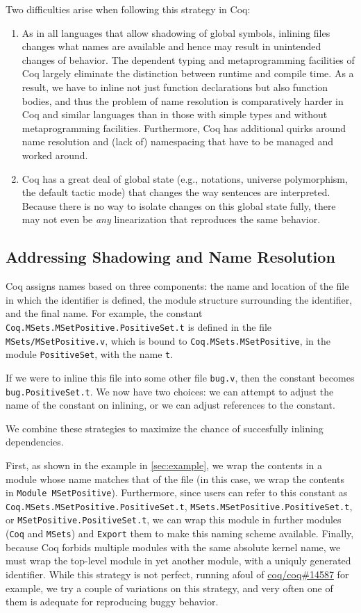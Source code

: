 \documentclass[a4paper,USenglish,cleveref,autoref,thm-restate]{lipics-v2021}
\newcommand{\coqbug}[1]{\href{https://github.com/coq/coq/issues/#1}{coq/coq\##1}}
\begin{document}
Two difficulties arise when following this strategy in Coq:
\begin{enumerate}
\item As in all languages that allow shadowing of global symbols, inlining files changes what names are available and hence may result in unintended changes of behavior.
The dependent typing and metaprogramming facilities of Coq largely eliminate the distinction between runtime and compile time.
As a result, we have to inline not just function declarations but also function bodies, and thus the problem of name resolution is comparatively harder in Coq and similar languages than in those with simple types and without metaprogramming facilities.
Furthermore, Coq has additional quirks around name resolution and (lack of) namespacing that have to be managed and worked around.
\item Coq has a great deal of global state (e.g., notations, universe polymorphism, the default tactic mode) that changes the way sentences are interpreted.
Because there is no way to isolate changes on this global state fully, there may not even be \emph{any} linearization that reproduces the same behavior.
\end{enumerate}

\subsection{Addressing Shadowing and Name Resolution}\label{sec:name-resolution}
Coq assigns names based on three components: the name and location of the file in which the identifier is defined, the module structure surrounding the identifier, and the final name.
For example, the constant \texttt{Coq.MSets.MSetPositive.PositiveSet.t} is defined in the file \texttt{MSets/MSetPositive.v}, which is bound to \texttt{Coq.MSets.MSetPositive}, in the module \texttt{PositiveSet}, with the name \texttt{t}.

If we were to inline this file into some other file \texttt{bug.v}, then the constant becomes \texttt{bug.PositiveSet.t}.
We now have two choices: we can attempt to adjust the name of the constant on inlining, or we can adjust references to the constant.

We combine these strategies to maximize the chance of succesfully inlining dependencies.

First, as shown in the example in \autoref{sec:example}, we wrap the contents in a module whose name matches that of the file (in this case, we wrap the contents in \texttt{Module MSetPositive}).
Furthermore, since users can refer to this constant as \texttt{Coq.MSets.MSetPositive.PositiveSet.t}, \texttt{MSets.MSetPositive.PositiveSet.t}, or \texttt{MSetPositive.PositiveSet.t}, we can wrap this module in further modules (\texttt{Coq} and \texttt{MSets}) and \texttt{Export} them to make this naming scheme available.
Finally, because Coq forbids multiple modules with the same absolute kernel name, we must wrap the top-level module in yet another module, with a uniquly generated identifier.
While this strategy is not perfect, running afoul of \coqbug{14587} for example, we try a couple of variations on this strategy, and very often one of them is adequate for reproducing buggy behavior.
\end{document}

